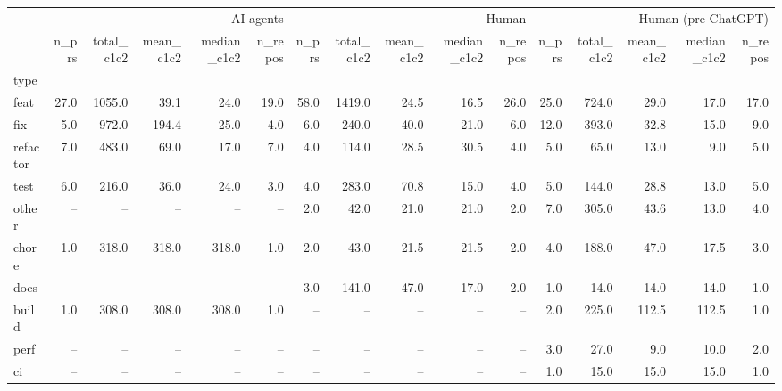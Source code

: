 \begin{tabular}{lrrrrrrrrrrrrrrr}
\toprule
 & \multicolumn{5}{r}{AI agents} & \multicolumn{5}{r}{Human} & \multicolumn{5}{r}{Human (pre-ChatGPT)} \\
 & n_prs & total_c1c2 & mean_c1c2 & median_c1c2 & n_repos & n_prs & total_c1c2 & mean_c1c2 & median_c1c2 & n_repos & n_prs & total_c1c2 & mean_c1c2 & median_c1c2 & n_repos \\
type &  &  &  &  &  &  &  &  &  &  &  &  &  &  &  \\
\midrule
feat & 27.0 & 1055.0 & 39.1 & 24.0 & 19.0 & 58.0 & 1419.0 & 24.5 & 16.5 & 26.0 & 25.0 & 724.0 & 29.0 & 17.0 & 17.0 \\
fix & 5.0 & 972.0 & 194.4 & 25.0 & 4.0 & 6.0 & 240.0 & 40.0 & 21.0 & 6.0 & 12.0 & 393.0 & 32.8 & 15.0 & 9.0 \\
refactor & 7.0 & 483.0 & 69.0 & 17.0 & 7.0 & 4.0 & 114.0 & 28.5 & 30.5 & 4.0 & 5.0 & 65.0 & 13.0 & 9.0 & 5.0 \\
test & 6.0 & 216.0 & 36.0 & 24.0 & 3.0 & 4.0 & 283.0 & 70.8 & 15.0 & 4.0 & 5.0 & 144.0 & 28.8 & 13.0 & 5.0 \\
other & -- & -- & -- & -- & -- & 2.0 & 42.0 & 21.0 & 21.0 & 2.0 & 7.0 & 305.0 & 43.6 & 13.0 & 4.0 \\
chore & 1.0 & 318.0 & 318.0 & 318.0 & 1.0 & 2.0 & 43.0 & 21.5 & 21.5 & 2.0 & 4.0 & 188.0 & 47.0 & 17.5 & 3.0 \\
docs & -- & -- & -- & -- & -- & 3.0 & 141.0 & 47.0 & 17.0 & 2.0 & 1.0 & 14.0 & 14.0 & 14.0 & 1.0 \\
build & 1.0 & 308.0 & 308.0 & 308.0 & 1.0 & -- & -- & -- & -- & -- & 2.0 & 225.0 & 112.5 & 112.5 & 1.0 \\
perf & -- & -- & -- & -- & -- & -- & -- & -- & -- & -- & 3.0 & 27.0 & 9.0 & 10.0 & 2.0 \\
ci & -- & -- & -- & -- & -- & -- & -- & -- & -- & -- & 1.0 & 15.0 & 15.0 & 15.0 & 1.0 \\
\bottomrule
\end{tabular}
